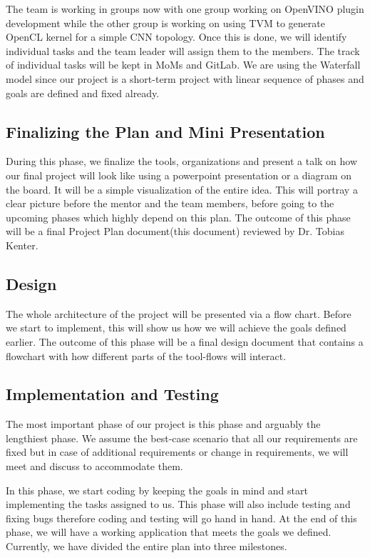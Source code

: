 \documentclass[titlepage]{report}
\begin{document}
The team is working in groups now with one group working on OpenVINO plugin development while the other group is working on using TVM to generate OpenCL kernel for a simple CNN topology. Once this is done, we will identify individual tasks and the team leader will assign them to the members. The track of individual tasks will be kept in MoMs and GitLab. We are using the Waterfall model since our project is a short-term project with linear sequence of phases and goals are defined and fixed already. 


\subsection{Finalizing the Plan and Mini Presentation}
During this phase, we finalize the tools, organizations and present a talk on how our final project will look like using a powerpoint presentation or a diagram on the board. It will be a simple visualization of the entire idea. This will portray a clear picture before the mentor and the team members, before going to the upcoming phases which highly depend on this plan. The outcome of this phase will be a final Project Plan document(this document) reviewed by Dr. Tobias Kenter. 

\subsection{Design}
The whole architecture of the project will be presented via a flow chart. Before we start to implement, this will show us how we will achieve the goals defined earlier. The outcome of this phase will be a final design document that contains a flowchart with how different parts of the tool-flows will interact.  

\subsection{Implementation and Testing}
The most important phase of our project is this phase and arguably the lengthiest phase. We assume the best-case scenario that all our requirements are fixed but in case of additional requirements or change in requirements, we will meet and discuss to accommodate them. 

In this phase, we start coding by keeping the goals in mind and start implementing the tasks assigned to us. This phase will also include testing and fixing bugs therefore coding and testing will go hand in hand. At the end of this phase, we will have a working application that meets the goals we defined. Currently, we have divided the entire plan into three milestones. 
\end{document}
